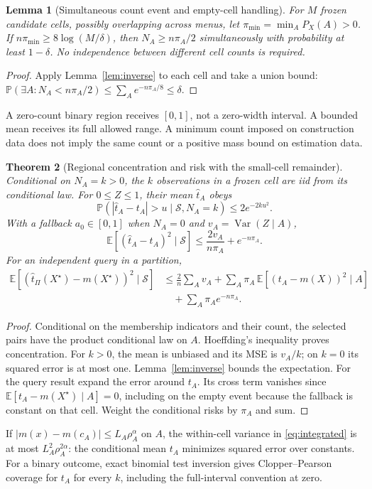 \documentclass[11pt,a4paper]{article}
\newcommand{\E}{\mathbb E}\newcommand{\Pp}{\mathbb P}
\newcommand{\Var}{\operatorname{Var}}
\numberwithin{equation}{section}
\newtheorem{theorem}{Theorem}[section]
\newtheorem{lemma}[theorem]{Lemma}
\theoremstyle{definition}\newtheorem{definition}[theorem]{Definition}
\theoremstyle{remark}\newtheorem{remark}[theorem]{Remark}
\begin{document}
\begin{lemma}[Simultaneous count event and empty-cell handling]\label{lem:small}
For $M$ frozen candidate cells, possibly overlapping across menus, let
$\pi_{\min}=\min_A P_X(A)>0$. If $n\pi_{\min}\ge8\log(M/\delta)$, then
$N_A\ge n\pi_A/2$ simultaneously with probability at least $1-\delta$.
No independence between different cell counts is required.
\end{lemma}
\begin{proof}
Apply Lemma~\ref{lem:inverse} to each cell and take a union bound:
$\Pp(\exists A:N_A<n\pi_A/2)\le\sum_Ae^{-n\pi_A/8}\le\delta$.
\end{proof}
A zero-count binary region receives $[0,1]$, not a zero-width interval. A bounded mean receives its full allowed range. A minimum count imposed on construction data does not imply the same count or a positive mass bound on estimation data.

\begin{theorem}[Regional concentration and risk with the small-cell remainder]\label{thm:basic}
Conditional on $N_A=k>0$, the $k$ observations in a frozen cell are iid from its conditional law. For $0\le Z\le1$, their mean $\hat t_A$ obeys
\[
 \Pp(|\hat t_A-t_A|>u\mid\mathcal S,N_A=k)\le2e^{-2ku^2}.
\]
With a fallback $a_0\in[0,1]$ when $N_A=0$ and $v_A=\Var(Z\mid A)$,
\[
 \E[(\hat t_A-t_A)^2\mid\mathcal S]
 \le\frac{2v_A}{n\pi_A}+e^{-n\pi_A}.
\]
For an independent query in a partition,
\begin{align}
 \E[(\hat t_\Pi(X^\star)-m(X^\star))^2\mid\mathcal S]
 &\le \frac2n\sum_Av_A
 +\sum_A\pi_A\,\E[(t_A-m(X))^2\mid A]\nonumber\\
 &\quad+\sum_A\pi_Ae^{-n\pi_A}. \label{eq:integrated}
\end{align}
\end{theorem}
\begin{proof}
Conditional on the membership indicators and their count, the selected pairs have the product conditional law on $A$. Hoeffding's inequality proves concentration. For $k>0$, the mean is unbiased and its MSE is $v_A/k$; on $k=0$ its squared error is at most one. Lemma~\ref{lem:inverse} bounds the expectation. For the query result expand the error around $t_A$. Its cross term vanishes since $\E[t_A-m(X^\star)\mid A]=0$, including on the empty event because the fallback is constant on that cell. Weight the conditional risks by $\pi_A$ and sum.
\end{proof}
If $|m(x)-m(c_A)|\le L_A\rho_A^\alpha$ on $A$, the within-cell variance in \eqref{eq:integrated} is at most $L_A^2\rho_A^{2\alpha}$: the conditional mean $t_A$ minimizes squared error over constants. For a binary outcome, exact binomial test inversion gives Clopper--Pearson coverage for $t_A$ for every $k$, including the full-interval convention at zero.
\end{document}
